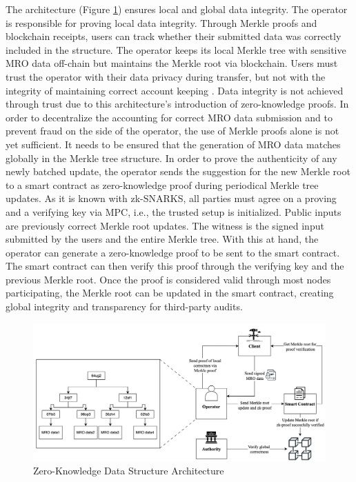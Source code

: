 The architecture (Figure \ref{fig:arch}) ensures local and global data integrity. The operator is responsible for proving local data integrity. Through Merkle proofs and blockchain receipts, users can track whether their submitted data was correctly included in the structure. The operator keeps its local Merkle tree with sensitive MRO data off-chain but maintains the Merkle root via blockchain. Users must trust the operator with their data privacy during transfer, but not with the integrity of maintaining correct account keeping \citep{sedlemeirgrenenergy}. Data integrity is not achieved through trust due to this architecture's introduction of zero-knowledge proofs. In order to decentralize the accounting for correct MRO data submission and to prevent fraud on the side of the operator, the use of Merkle proofs alone is not yet sufficient. It needs to be ensured that the generation of MRO data matches globally in the Merkle tree structure. In order to prove the authenticity of any newly batched update, the operator sends the suggestion for the new Merkle root to a smart contract as zero-knowledge proof during periodical Merkle tree updates. As it is known with zk-SNARKS, all parties must agree on a proving and a verifying key via MPC, i.e., the trusted setup is initialized. Public inputs are previously correct Merkle root updates. The witness is the signed input submitted by the users and the entire Merkle tree. With this at hand, the operator can generate a zero-knowledge proof to be sent to the smart contract. The smart contract can then verify this proof through the verifying key and the previous Merkle root. Once the proof is considered valid through most nodes participating, the Merkle root can be updated in the smart contract, creating global integrity and transparency for third-party audits. 

\begin{figure}[hbt]
	\centering
		\includegraphics[width=1.0\textwidth]{Pictures/architecture.png}
	\caption{Zero-Knowledge Data Structure Architecture}
	\label{fig:arch}
\end{figure}

